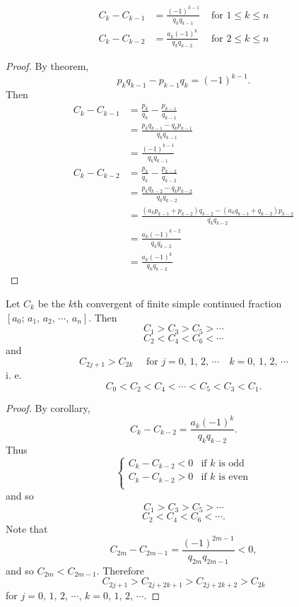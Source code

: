 \begin{corollary}
    \begin{align*}
        C_k-C_{k-1} &= \frac{\left(-1\right)^{k-1}}{q_k q_{k-1}}&\mbox{ for }1 \leq k \leq n \\    
        C_k-C_{k-2} &= \frac{a_k\left(-1\right)^{k}}{q_k q_{k-2}}&\mbox{ for }2 \leq k \leq n        
    \end{align*}
\end{corollary}
    
\begin{proof}
    By theorem,
    \[
        p_kq_{k-1}-p_{k-1}q_k = \left(-1\right)^{k-1}.
    \]
    Then
    \begin{align*}
        C_k-C_{k-1} &= \frac{p_k}{q_k} - \frac{p_{k-1}}{q_{k-1}} \\
        &= \frac{p_kq_{k-1} - q_kp_{k-1}}{q_kq_{k-1}} \\
        &= \frac{\left(-1\right)^{k-1}}{q_kq_{k-1}}\\
        C_k-C_{k-2} &= \frac{p_k}{q_k} - \frac{p_{k-2}}{q_{k-2}} \\
        &= \frac{p_kq_{k-2} - q_kp_{k-2}}{q_kq_{k-2}} \\
        &= \frac{\left(a_kp_{k-1}+p_{k-2}\right)q_{k-2} - \left(a_kq_{k-1}+q_{k-2}\right)p_{k-2}}{q_kq_{k-2}} \\
        &= \frac{a_k\left(-1\right)^{k-2}}{q_kq_{k-2}} \\
        &= \frac{a_k\left(-1\right)^k}{q_kq_{k-2}}
    \end{align*}
\end{proof}

\begin{theorem}
    Let $C_k$ be the $k$th convergent of finite simple continued fraction
    $\left[a_0;\,a_1,\,a_2,\,\cdots,\,a_n\right]$. Then
    \[
        C_1>C_3>C_5>\cdots
    \]
    \[
        C_2<C_4<C_6<\cdots
    \]
    and
    \[
        C_{2j+1} > C_{2k} \quad\mbox{ for } j=0,\,1,\,2,\,\cdots \quad k=0,\,1,\,2,\,\cdots
    \]
    i. e. 
    \[
        C_0 < C_2 < C_4 < \cdots < C_5 < C_3 < C_1.
    \]
\end{theorem}

\begin{proof}
    By corollary,
    \[
        C_k-C_{k-2} = \frac{a_k \left(-1\right)^k}{q_k q_{k-2}}.
    \]
    Thus\[
        \begin{cases}
            C_k-C_{k-2} < 0 & \mbox{if $k$ is odd} \\
            C_k-C_{k-2} > 0 & \mbox{if $k$ is even} \\
        \end{cases}
    \]
    and so
    \[
        C_1>C_3>C_5>\cdots
    \]
    \[
        C_2<C_4<C_6<\cdots.
    \]
    Note that
    \[
        C_{2m} - C_{2m - 1} = \frac{\left(-1\right)^{2m-1}}{q_{2m}q_{2m-1}}<0,
    \]
    and so $C_{2m} < C_{2m-1}$. Therefore
    \[
        C_{2j+1} > C_{2j+2k+1} > C_{2j+2k+2} > C_{2k}
    \]
    for $j=0,\,1,\,2,\,\cdots$, $k=0,\,1,\,2,\,\cdots$.
\end{proof}


